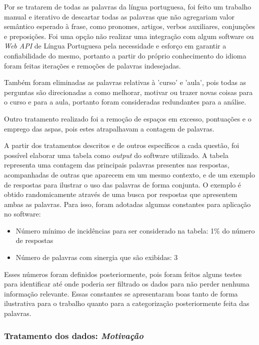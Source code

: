 Por se tratarem de todas as palavras da língua portuguesa, foi feito um trabalho manual e iterativo de descartar todas as palavras que não agregariam valor semântico esperado à frase, como pronomes, artigos, verbos auxiliares, conjunções e preposições. Foi uma opção não realizar uma integração com algum software ou \textit{Web API} de Língua Portuguesa pela necessidade e esforço em garantir a confiabilidade do mesmo, portanto a partir do próprio conhecimento do idioma foram feitas iterações e remoções de palavras indesejadas.

Também foram eliminadas as palavras relativas à 'curso' e 'aula', pois todas as perguntas são direcionadas a como melhorar, motivar ou trazer novas coisas para o curso e para a aula, portanto foram consideradas redundantes para a análise.

Outro tratamento realizado foi a remoção de espaços em excesso, pontuações e o emprego das aspas, pois estes atrapalhavam a contagem de palavras.

A partir dos tratamentos descritos e de outros específicos a cada questão, foi possível elaborar uma tabela como \textit{output} do software utilizado. A tabela representa uma contagem das principais palavras presentes nas respostas, acompanhadas de outras que aparecem em um mesmo contexto, e de um exemplo de respostas para ilustrar o uso das palavras de forma conjunta. O exemplo é obtido randomicamente através de uma busca por respostas que apresentem ambas as palavras. Para isso, foram adotadas algumas constantes para aplicação no software:

\begin{itemize}
\item Número mínimo de incidências para ser considerado na tabela: 1\% do número de respostas
\item Número de palavras com sinergia que são exibidas: 3
\end{itemize}

Esses números foram definidos posteriormente, pois foram feitos alguns testes para identificar até onde poderia ser filtrado os dados para não perder nenhuma informação relevante. Essas constantes se apresentaram boas tanto de forma ilustrativa para o trabalho quanto para a categorização posteriormente feita das palavras.

\subsubsection*{Tratamento dos dados: \textit{Motivação}}

